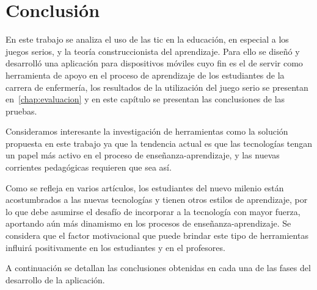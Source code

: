 \chapter{Conclusión}
\label{chap:conclusion}


En este trabajo se analiza el uso de las \Gls{tic} en la educación, en especial
a los juegos serios, y la teoría construccionista del aprendizaje. Para ello se
diseñó y desarrolló una aplicación para dispositivos móviles cuyo fin es el de
servir como herramienta de apoyo en el proceso de aprendizaje de los estudiantes
de la carrera de enfermería, los resultados de la utilización del juego serio se
presentan en~\ref{chap:evaluacion} y en este capítulo se presentan las
conclusiones de las pruebas.

Consideramos interesante la investigación de herramientas como la solución
propuesta en este trabajo ya que la tendencia actual es que las tecnologías
tengan un papel más activo en el proceso de enseñanza-aprendizaje, y las nuevas
corrientes pedagógicas requieren que sea así. 

Como se refleja en varios artículos, los estudiantes del nuevo milenio están
acostumbrados a las nuevas tecnologías y tienen otros estilos de aprendizaje,
por lo que debe asumirse el desafío de incorporar a la tecnología con mayor
fuerza, aportando aún más dinamismo en los procesos de enseñanza-aprendizaje. Se
considera que el factor motivacional que puede brindar este tipo de herramientas
influirá positivamente en los estudiantes y en el profesores.

A continuación se detallan las conclusiones obtenidas en cada una de las fases
del desarrollo de la aplicación.

%
%
%

%
%
%



